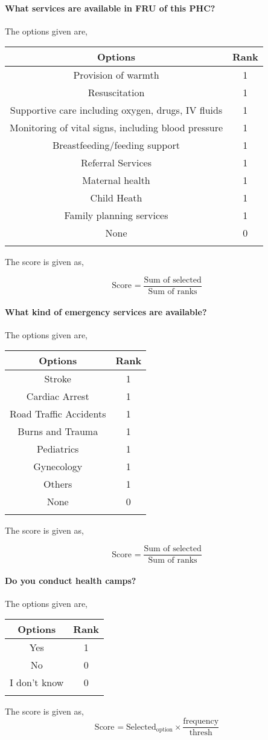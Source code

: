 \documentclass[oneside]{article}
\newcommand{\tsub}[2]{\text{#1}_{\text{#2}}}
\newcommand{\dsub}[2]{\dfrac{\text{#1}}{\text{#2}}}
\newcommand{\multsel}[1]
{
	\[
		\tsub{Score}{#1} = \dsub{Sum of selected}{Sum of ranks}
	\]
}
\newenvironment{ttable}
{
\begin{center}
\begin{tabular}{c|c}
\hline
}
{
\\ \hline
\end{tabular}
\end{center}
}
\begin{document}
\paragraph{ What services are available in FRU of this PHC?}
The options given are,
\begin{ttable}
Options & Rank \\ \hline
Provision of warmth & 1 \\
Resuscitation & 1 \\
Supportive care including oxygen, drugs, IV fluids & 1 \\
Monitoring of vital signs, including blood pressure & 1 \\
Breastfeeding/feeding support & 1 \\
Referral Services & 1 \\
Maternal health & 1 \\
Child Heath & 1 \\
Family planning services & 1 \\
None & 0 \\
\hline
\end{ttable}
The score is given as,
\multsel{}
\paragraph{ What kind of emergency services are available?}
The options given are,
\begin{ttable}
Options & Rank \\ \hline
Stroke & 1 \\
Cardiac Arrest & 1 \\
Road Traffic Accidents & 1 \\
Burns and Trauma & 1 \\
Pediatrics & 1 \\
Gynecology & 1 \\
Others & 1 \\
None & 0 \\
\hline
\end{ttable}
The score is given as,
\multsel{}
\paragraph{ Do you conduct health camps?}
The options given are,
\begin{ttable}
Options & Rank \\ \hline
Yes & 1 \\
No & 0 \\
I don't know & 0 \\
\hline
\end{ttable}
The score is given as,
\[
	\tsub{Score}{} = \tsub{Selected}{option} \times \dsub{frequency}{thresh}
\]
\end{document}
